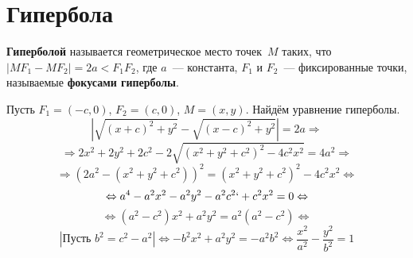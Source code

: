 \section{Гипербола}
\begin{wrapfigure}[19]{r}{0pt}\noindent
{}
\end{wrapfigure}

 \textbf{Гиперболой} называется геометрическое место точек~$M$ таких, что $|MF_1 - MF_2| = 2a < F_1 F_2$, где $a$~--- константа, $F_1$ и $F_2$~--- фиксированные точки, называемые \textbf{фокусами гиперболы}.

Пусть $F_1 = (-c, 0)$, $F_2 = (c, 0)$, $M = (x, y)$.
Найдём уравнение гиперболы.
\begin{equation*}
\left|\sqrt{(x + c)^2 + y^2} - \sqrt{(x - c)^2 + y^2}\right| = 2a \Rightarrow
\end{equation*}
\begin{equation*}
\Rightarrow 2x^2 + 2y^2 + 2c^2 - 2\sqrt{(x^2 + y^2 + c^2)^2 - 4c^2 x^2} = 4a^2 \Rightarrow
\end{equation*}
\begin{equation*}
\Rightarrow (2a^2 - (x^2 + y^2 + c^2))^2 = (x^2 + y^2 + c^2)^2 - 4c^2 x^2 \Leftrightarrow
\end{equation*}
\begin{equation*}
\Leftrightarrow a^4 - a^2 x^2 - a^2 y^2 - a^2 c^2`+ c^2 x^2 = 0 \Leftrightarrow
\end{equation*}
\begin{equation*}
\Leftrightarrow (a^2 - c^2) x^2 + a^2 y^2 = a^2 (a^2 - c^2) \Leftrightarrow
\end{equation*}
\begin{equation*}
\left|\text{Пусть $b^2 = c^2 - a^2$}\right|
\Leftrightarrow -b^2 x^2 + a^2 y^2 = -a^2 b^2 \Leftrightarrow
\frac{x^2}{a^2} - \frac{y^2}{b^2} = 1
\end{equation*}


